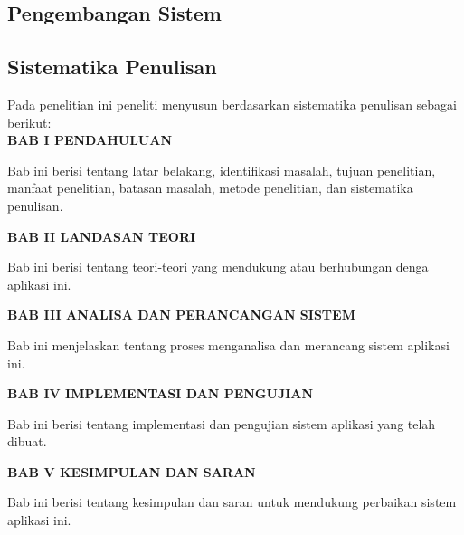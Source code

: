 \subsection{Pengembangan Sistem}

\subsection{Sistematika Penulisan}
Pada penelitian ini peneliti menyusun berdasarkan sistematika penulisan sebagai berikut: \\
\noindent \textbf{BAB I \hspace{1cm} PENDAHULUAN}
\begin{addmargin}[2.35cm]{0em}
Bab ini berisi tentang latar belakang, identifikasi masalah, tujuan penelitian, manfaat penelitian, batasan masalah, metode penelitian, dan sistematika penulisan.
\end{addmargin}
\noindent \textbf{BAB II \hspace{0.8cm} LANDASAN TEORI}
\begin{addmargin}[2.35cm]{0em}
Bab ini berisi tentang teori-teori yang mendukung atau berhubungan denga aplikasi ini.
\end{addmargin}
\noindent \textbf{BAB III \hspace{0.7cm} ANALISA DAN PERANCANGAN SISTEM}
\begin{addmargin}[2.35cm]{0em}
Bab ini menjelaskan tentang proses menganalisa dan merancang sistem aplikasi ini.
\end{addmargin}
\noindent \textbf{BAB IV \hspace{0.7cm} IMPLEMENTASI DAN PENGUJIAN}
\begin{addmargin}[2.35cm]{0em}
Bab ini berisi tentang implementasi dan pengujian sistem aplikasi yang telah dibuat.
\end{addmargin}
\noindent \textbf{BAB V \hspace{0.8cm} KESIMPULAN DAN SARAN}
\begin{addmargin}[2.35cm]{0em}
Bab ini berisi tentang kesimpulan dan saran untuk mendukung perbaikan sistem aplikasi ini.
\end{addmargin}

\newpage